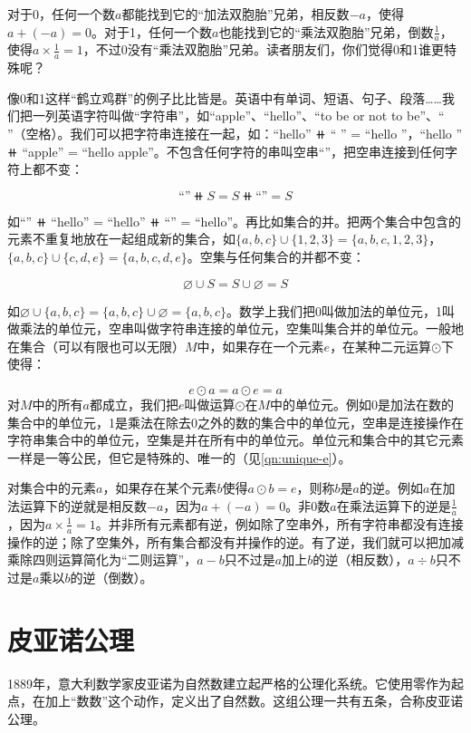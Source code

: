 \documentclass[b5paper]{ctexart}
\begin{document}
对于0，任何一个数$a$都能找到它的“加法双胞胎”兄弟，相反数$-a$，使得$a + (-a) = 0$。对于1，任何一个数$a$也能找到它的“乘法双胞胎”兄弟，倒数$\frac{1}{a}$，使得$a \times \frac{1}{a} = 1$，不过0没有“乘法双胞胎”兄弟。读者朋友们，你们觉得0和1谁更特殊呢？

像0和1这样“鹤立鸡群”的例子比比皆是。英语中有单词、短语、句子、段落……我们把一列英语字符叫做“字符串”，如``apple''、``hello''、``to be or not to be''、`` ''（空格）。我们可以把字符串连接在一起，如：``hello'' $\doubleplus$ `` '' = ``hello ''，``hello '' $\doubleplus$ ``apple'' = ``hello apple''。不包含任何字符的串叫空串``''，把空串连接到任何字符上都不变：

\[
\text{``''} \doubleplus S = S \doubleplus \text{``''} = S
\]

如``'' $\doubleplus$ ``hello'' = ``hello'' $\doubleplus$ ``'' = ``hello''。再比如集合的并。把两个集合中包含的元素不重复地放在一起组成新的集合，如$\{a, b, c\} \cup \{1, 2, 3\} = \{a, b, c, 1, 2, 3\}$，$\{a, b, c\} \cup \{c, d, e\} = \{a, b, c, d, e\}$。空集与任何集合的并都不变：

\[
\varnothing \cup S = S \cup \varnothing = S
\]

如$\varnothing \cup \{a, b, c\} = \{a, b, c\} \cup \varnothing = \{a, b, c\}$。数学上我们把0叫做加法的单位元，1叫做乘法的单位元，空串叫做字符串连接的单位元，空集叫集合并的单位元。一般地在集合（可以有限也可以无限）$M$中，如果存在一个元素$e$，在某种二元运算$\odot$下使得：

\[
  e \odot a = a \odot e = a
\]
对$M$中的所有$a$都成立，我们把$e$叫做运算$\odot$在$M$中的单位元。例如0是加法在数的集合中的单位元，1是乘法在除去0之外的数的集合中的单位元，空串是连接操作在字符串集合中的单位元，空集是并在所有中的单位元。单位元和集合中的其它元素一样是一等公民，但它是特殊的、唯一的（见\cref{qn:unique-e}）。

 
对集合中的元素$a$，如果存在某个元素$b$使得$a \odot b = e$，则称$b$是$a$的逆。例如$a$在加法运算下的逆就是相反数$-a$，因为$a + (-a) = 0$。非0数$a$在乘法运算下的逆是$\frac{1}{a}$，因为$a \times \frac{1}{a} = 1$。并非所有元素都有逆，例如除了空串外，所有字符串都没有连接操作的逆；除了空集外，所有集合都没有并操作的逆。有了逆，我们就可以把加减乘除四则运算简化为“二则运算”，$a - b$只不过是$a$加上$b$的逆（相反数），$a \div b$只不过是$a$乘以$b$的逆（倒数）。

\section{皮亚诺公理}
\label{sec:peano-axioms}
1889年，意大利数学家皮亚诺为自然数建立起严格的公理化系统。它使用零作为起点，在加上“数数”这个动作，定义出了自然数。这组公理一共有五条，合称皮亚诺公理。
\end{document}
